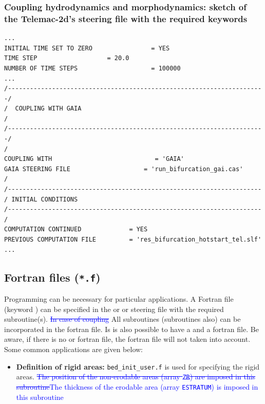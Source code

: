 {%
\subsubsection{Coupling hydrodynamics and morphodynamics: sketch of the Telemac-2d's steering file with the required keywords}
\lstset{language=TelemacCas,
        basicstyle=\scriptsize\ttfamily}
\begin{lstlisting}[frame=trBL]
...
INITIAL TIME SET TO ZERO                = YES
TIME STEP			        = 20.0
NUMBER OF TIME STEPS                    = 100000
...
/----------------------------------------------------------------------/
/  COUPLING WITH GAIA                                                  /
/----------------------------------------------------------------------/
/
COUPLING WITH                            = 'GAIA'
GAIA STEERING FILE                    = 'run_bifurcation_gai.cas'
/
/---------------------------------------------------------------------
/ INITIAL CONDITIONS
/---------------------------------------------------------------------
/
COMPUTATION CONTINUED             = YES
PREVIOUS COMPUTATION FILE         = 'res_bifurcation_hotstart_tel.slf'
...
\end{lstlisting}
\subsection{Fortran files (\texttt{*.f})}
Programming can be necessary for particular applications. A Fortran file (keyword ) can be specified in the  or  or \gaia steering file with the required subroutine(s). \textcolor{blue}{\sout{In case of coupling}} All subroutines (\gaia subroutines also) can be incorporated in the \telemac fortran file. Is is also possible to have a \telemac and a \gaia fortran file. Be aware, if there is no  or  fortran file, the \gaia fortran file will not taken into account.
Some common applications are given below:
\begin{itemize}
\item \textbf{Definition of rigid areas:} \texttt{bed\_init\_user.f} is used for specifying the rigid areas. \textcolor{blue}{\sout{The position of the non-erodable areas (array \texttt{ZR}) are imposed in this subroutine}}\textcolor{blue}{The thickness of the erodable area (array \texttt{ESTRATUM}) is imposed in this subroutine}


\end{itemize}}

